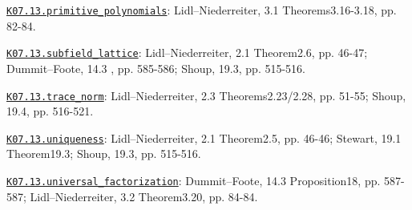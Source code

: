 \par\smallskip\noindent\hypertarget{src:K07.13.primitive_polynomials}{}\label{src:K07.13.primitive_polynomials}\hyperref[K07.13.primitive_polynomials]{\texttt{K07.13.primitive\_polynomials}}: Lidl--Niederreiter, 3.1 Theorems3.16-3.18, pp. 82-84.
\par\smallskip\noindent\hypertarget{src:K07.13.subfield_lattice}{}\label{src:K07.13.subfield_lattice}\hyperref[K07.13.subfield_lattice]{\texttt{K07.13.subfield\_lattice}}: Lidl--Niederreiter, 2.1 Theorem2.6, pp. 46-47; Dummit--Foote, 14.3 , pp. 585-586; Shoup, 19.3, pp. 515-516.
\par\smallskip\noindent\hypertarget{src:K07.13.trace_norm}{}\label{src:K07.13.trace_norm}\hyperref[K07.13.trace_norm]{\texttt{K07.13.trace\_norm}}: Lidl--Niederreiter, 2.3 Theorems2.23/2.28, pp. 51-55; Shoup, 19.4, pp. 516-521.
\par\smallskip\noindent\hypertarget{src:K07.13.uniqueness}{}\label{src:K07.13.uniqueness}\hyperref[K07.13.uniqueness]{\texttt{K07.13.uniqueness}}: Lidl--Niederreiter, 2.1 Theorem2.5, pp. 46-46; Stewart, 19.1 Theorem19.3; Shoup, 19.3, pp. 515-516.
\par\smallskip\noindent\hypertarget{src:K07.13.universal_factorization}{}\label{src:K07.13.universal_factorization}\hyperref[K07.13.universal_factorization]{\texttt{K07.13.universal\_factorization}}: Dummit--Foote, 14.3 Proposition18, pp. 587-587; Lidl--Niederreiter, 3.2 Theorem3.20, pp. 84-84.
